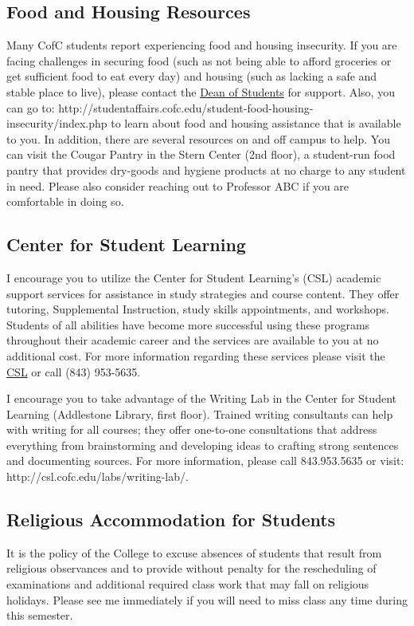 \subsection{Food and Housing Resources}

Many CofC students report experiencing food and housing insecurity. If you are facing challenges in securing food (such as not being able to afford groceries or get sufficient food to eat every day) and housing (such as lacking a safe and stable place to live), please contact the \href{http://studentaffairs.cofc.edu/about/salt.php}{Dean of Students} for support. Also, you can go to: http://studentaffairs.cofc.edu/student-food-housing-insecurity/index.php to learn about food and housing assistance that is available to you. In addition, there are several resources on and off campus to help. You can visit the Cougar Pantry in the Stern Center (2nd floor), a student-run food pantry that provides dry-goods and hygiene products at no charge to any student in need. Please also consider reaching out to Professor ABC if you are comfortable in doing so. 


\subsection{Center for Student
Learning}\label{center-for-student-learning}

I encourage you to utilize the Center for Student Learning's (CSL)
academic support services for assistance in study strategies and course
content. They offer tutoring, Supplemental Instruction, study skills
appointments, and workshops. Students of all abilities have become more
successful using these programs throughout their academic career and the
services are available to you at no additional cost. For more
information regarding these services please visit the 
\href{http://csl.cofc.edu}{CSL} or call (843) 953-5635.

\vspace{0.10in}
\noindent I encourage you to take advantage of the Writing Lab in the Center for Student Learning (Addlestone Library, first floor). Trained writing consultants can help with writing for all courses; they offer one-to-one consultations that address everything from brainstorming and developing ideas to crafting strong sentences and documenting sources. For more information, please call 843.953.5635 or visit: http://csl.cofc.edu/labs/writing-lab/.


\subsection{Religious Accommodation for Students}\label{religious-holiday-policy}

It is the policy of the College to excuse absences of students that
result from religious observances and to provide without penalty for the
rescheduling of examinations and additional required class work that may
fall on religious holidays. Please see me immediately if you will need
to miss class any time during this semester.
